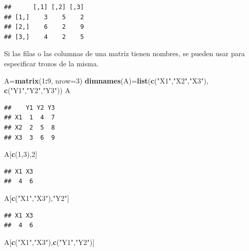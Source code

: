 \documentclass[]{book}
\newenvironment{Shaded}{\begin{snugshade}}{\end{snugshade}}
\newcommand{\DataTypeTok}[1]{\textcolor[rgb]{0.13,0.29,0.53}{#1}}
\newcommand{\DecValTok}[1]{\textcolor[rgb]{0.00,0.00,0.81}{#1}}
\newcommand{\KeywordTok}[1]{\textcolor[rgb]{0.13,0.29,0.53}{\textbf{#1}}}
\newcommand{\NormalTok}[1]{#1}
\newcommand{\OperatorTok}[1]{\textcolor[rgb]{0.81,0.36,0.00}{\textbf{#1}}}
\newcommand{\StringTok}[1]{\textcolor[rgb]{0.31,0.60,0.02}{#1}}
\theoremstyle{definition}
\theoremstyle{definition}
\theoremstyle{definition}
\theoremstyle{remark}
\begin{document}
\begin{verbatim}
##      [,1] [,2] [,3]
## [1,]    3    5    2
## [2,]    6    2    9
## [3,]    4    2    5
\end{verbatim}

Si las filas o las columnas de una matriz tienen nombres, se pueden usar para especificar trozos de la misma.

\begin{Shaded}
\begin{Highlighting}[]
\NormalTok{A=}\KeywordTok{matrix}\NormalTok{(}\DecValTok{1}\OperatorTok{:}\DecValTok{9}\NormalTok{, }\DataTypeTok{nrow=}\DecValTok{3}\NormalTok{)}
\KeywordTok{dimnames}\NormalTok{(A)=}\KeywordTok{list}\NormalTok{(}\KeywordTok{c}\NormalTok{(}\StringTok{"X1"}\NormalTok{,}\StringTok{"X2"}\NormalTok{,}\StringTok{"X3"}\NormalTok{), }\KeywordTok{c}\NormalTok{(}\StringTok{"Y1"}\NormalTok{,}\StringTok{"Y2"}\NormalTok{,}\StringTok{"Y3"}\NormalTok{))}
\NormalTok{A}
\end{Highlighting}
\end{Shaded}

\begin{verbatim}
##    Y1 Y2 Y3
## X1  1  4  7
## X2  2  5  8
## X3  3  6  9
\end{verbatim}

\begin{Shaded}
\begin{Highlighting}[]
\NormalTok{A[}\KeywordTok{c}\NormalTok{(}\DecValTok{1}\NormalTok{,}\DecValTok{3}\NormalTok{),}\DecValTok{2}\NormalTok{]}
\end{Highlighting}
\end{Shaded}

\begin{verbatim}
## X1 X3 
##  4  6
\end{verbatim}

\begin{Shaded}
\begin{Highlighting}[]
\NormalTok{A[}\KeywordTok{c}\NormalTok{(}\StringTok{"X1"}\NormalTok{,}\StringTok{"X3"}\NormalTok{),}\StringTok{"Y2"}\NormalTok{]}
\end{Highlighting}
\end{Shaded}

\begin{verbatim}
## X1 X3 
##  4  6
\end{verbatim}

\begin{Shaded}
\begin{Highlighting}[]
\NormalTok{A[}\KeywordTok{c}\NormalTok{(}\StringTok{"X1"}\NormalTok{,}\StringTok{"X3"}\NormalTok{),}\KeywordTok{c}\NormalTok{(}\StringTok{"Y1"}\NormalTok{,}\StringTok{"Y2"}\NormalTok{)]}
\end{Highlighting}
\end{Shaded}
\end{document}
